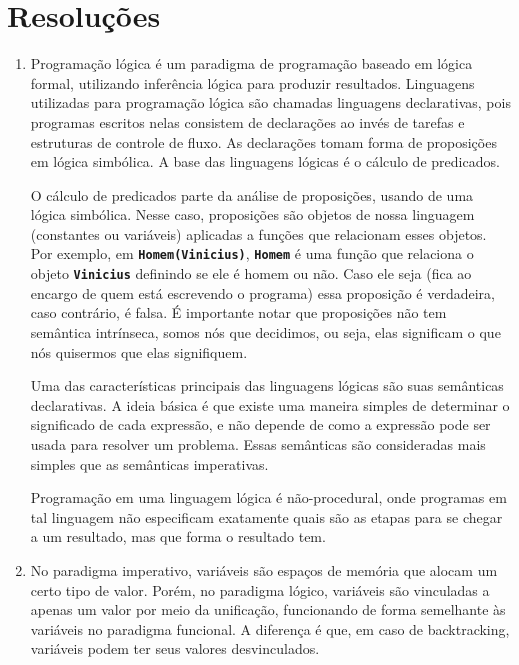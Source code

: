 \documentclass[12pt, a4paper]{article}
\newcommand{\inlinecode}[1]{\textbf{\lstinline{#1}}}
\begin{document}
\section{Resoluções}
    \begin{enumerate}[leftmargin=*]
        \item
        Programação lógica é um paradigma de programação baseado em lógica
        formal, utilizando inferência lógica para produzir resultados.
        Linguagens utilizadas para programação lógica são chamadas linguagens
        declarativas, pois programas escritos nelas consistem de declarações ao
        invés de tarefas e estruturas de controle de fluxo. As declarações
        tomam forma de proposições em lógica simbólica. A base das linguagens
        lógicas é o cálculo de predicados.

        O cálculo de predicados parte da análise de proposições, usando de uma
        lógica simbólica. Nesse caso, proposições são objetos de nossa
        linguagem (constantes ou variáveis) aplicadas a funções que relacionam
        esses objetos. Por exemplo, em \inlinecode{Homem(Vinicius)},
        \inlinecode{Homem} é uma função que relaciona o objeto
        \inlinecode{Vinicius} definindo se ele é homem ou não. Caso ele seja
        (fica ao encargo de quem está escrevendo o programa) essa proposição é
        verdadeira, caso contrário, é falsa. É importante notar que proposições
        não tem semântica intrínseca, somos nós que decidimos, ou seja, elas
        significam o que nós quisermos que elas signifiquem.

        Uma das características principais das linguagens lógicas são suas
        semânticas declarativas. A ideia básica é que existe uma maneira
        simples de determinar o significado de cada expressão, e não depende de
        como a expressão pode ser usada para resolver um problema. Essas
        semânticas são consideradas mais simples que as semânticas imperativas.

        Programação em uma linguagem lógica é não-procedural, onde programas em
        tal linguagem não especificam exatamente quais são as etapas para se
        chegar a um resultado, mas que forma o resultado tem.

        \item
        No paradigma imperativo, variáveis são espaços de memória que alocam um
        certo tipo de valor. Porém, no paradigma lógico, variáveis são
        vinculadas a apenas um valor por meio da unificação, funcionando de
        forma semelhante às variáveis no paradigma funcional. A diferença é
        que, em caso de backtracking, variáveis podem ter seus valores
        desvinculados.


\end{enumerate}
\end{document}

